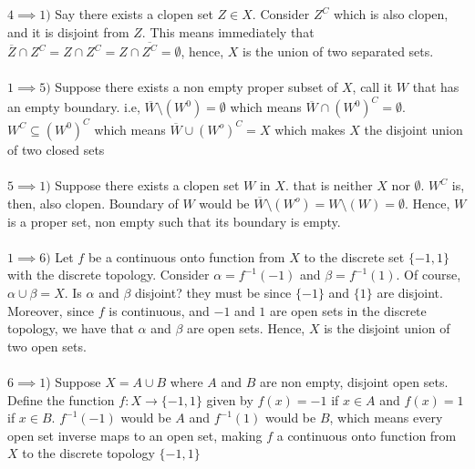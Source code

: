 \documentclass[../Main.tex]{subfiles}
\begin{document}
{\\\\ $4 \implies 1)$ Say there exists a clopen set $Z \in X$. Consider $Z^C$ which is also clopen, and it is disjoint from $Z$. This means immediately that $\overline{Z} \cap Z^C=Z \cap Z^C =Z \cap \overline{Z^C}=\emptyset$, hence, $X$ is the union of two separated sets.
\\\\ $1 \implies 5)$ Suppose there exists a non empty proper subset of $X$, call it $W$ that has an empty boundary. i.e, $\overline{W}\setminus(W^0)=\emptyset$ which means $\overline{W} \cap (W^0)^C=\emptyset$. $ W^C\subseteq (W^0)^C$ which means $\overline{W} \cup (W^o)^C=X$ which makes $X$ the disjoint union of two closed sets 
\\\\ $5 \implies 1) $ Suppose there exists a clopen set $W$ in $X$. that is neither $X$ nor $\emptyset$. $W^C$ is, then, also clopen. Boundary of $W$ would be $\overline{W} \setminus(W^o)=W \setminus(W)=\emptyset$. Hence, $W$ is a proper set, non empty such that its boundary is empty. 
\\\\ $1 \implies 6)$ Let $f$ be a continuous onto function from $X$ to the discrete set $\{-1,1\}$ with the discrete topology. Consider $\alpha=f^{-1}(-1)$ and $\beta=f^{-1}(1)$. Of course, $\alpha \cup \beta=X$. Is $\alpha$ and $\beta$ disjoint? they must be since $\{-1\}$ and $\{1\}$ are disjoint. Moreover, since $f$ is continuous, and $-1$ and $1$ are open sets in the discrete topology, we have that $\alpha$ and $\beta$ are open sets. Hence, $X$ is the disjoint union of two open sets.
\\\\ $6 \implies 1$) Suppose $X=A \cup B$ where $A $ and $B$ are non empty, disjoint open sets. Define the function $f:X \to \{-1,1\}$ given by $f(x)=-1$ if $x \in A$ and $f(x)=1$ if $x \in B$. $f^{-1}(-1)$ would be $A$ and $f^{-1}(1)$ would be $B$, which means every open set inverse maps to an open set, making $f$ a continuous onto function from $X$ to the discrete topology $\{-1,1\}$ }
\end{document}
